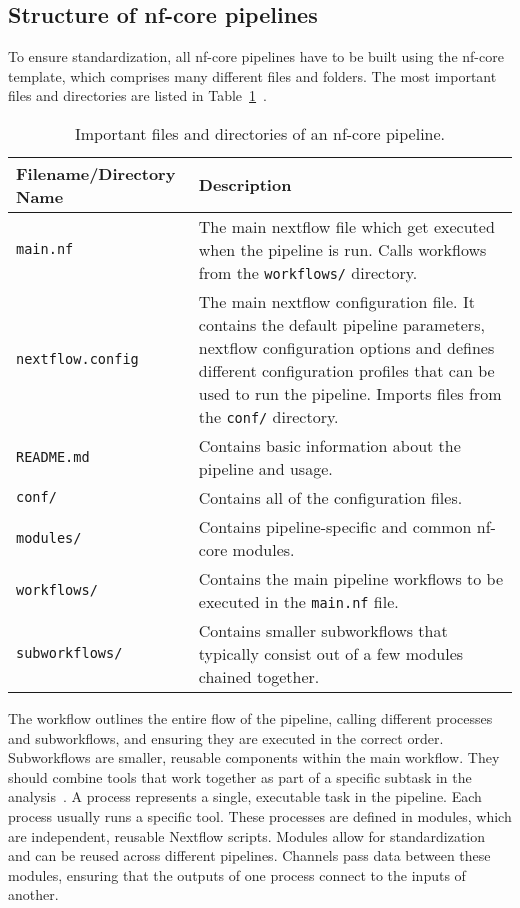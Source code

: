 \documentclass[12pt]{article}
\begin{document}
\subsection{Structure of nf-core pipelines}
To ensure standardization, all nf-core pipelines have to be built using the nf-core template, which comprises many different files and folders. The most important files and directories are listed in Table~\ref{nfcorefiles}~\cite{nfcorefs}.
\begin{table}[h]
    \centering
    \caption{Important files and directories of an nf-core pipeline.}
    \begin{tabular}{@{}lp{9cm}@{}}
        \toprule
        \textbf{Filename/Directory Name} & \textbf{Description} \\ \midrule
        \verb|main.nf| & The main nextflow file which get executed when the pipeline is run. Calls workflows from the \verb|workflows/| directory. \\
        \verb|nextflow.config| & The main nextflow configuration file. It contains the default pipeline parameters, nextflow configuration options and defines different configuration profiles that can be used to run the pipeline. Imports files from the \verb|conf/| directory. \\
        \verb|README.md| & Contains basic information about the pipeline and usage. \\
        \verb|conf/| & Contains all of the configuration files. \\
        \verb|modules/| & Contains pipeline-specific and common nf-core modules. \\
        \verb|workflows/| & Contains the main pipeline workflows to be executed in the \verb|main.nf| file. \\
        \verb|subworkflows/| & Contains smaller subworkflows that typically consist out of a few modules chained together. \\ \bottomrule
    \end{tabular}
    \label{nfcorefiles}
\end{table}

The workflow outlines the entire flow of the pipeline, calling different processes and subworkflows, and ensuring they are executed in the correct order.
Subworkflows are smaller, reusable components within the main workflow. They should combine tools that work together as part of a specific subtask in the analysis~\cite{nfcorefs}.
A process represents a single, executable task in the pipeline. Each process usually runs a specific tool. These processes are defined in modules, which are independent, reusable Nextflow scripts. Modules allow for standardization and can be reused across different pipelines. 
Channels pass data between these modules, ensuring that the outputs of one process connect to the inputs of another.
\end{document}
